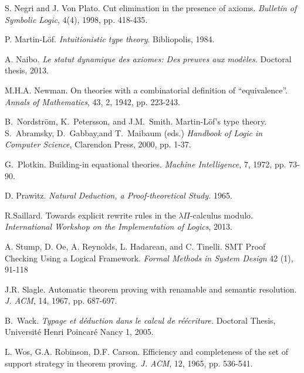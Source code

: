 \documentclass{llncs}
\begin{document}
\begin{thebibliography}{99.}
S. Negri and J. Von Plato.
Cut elimination in the presence of axioms.
{\em Bulletin of Symbolic Logic}, 4(4), 1998, pp. 418-435.

P. Martin-L\"of.
{\em Intuitionistic type theory}.
Bibliopolis, 1984.

A. Naibo.
{\em Le statut dynamique des axiomes: Des preuves aux mod\`eles.}
Doctoral thesis, 2013.

M.H.A. Newman.
On theories with a combinatorial definition of ``equivalence''. 
{\em Annals of Mathematics}, 43, 2, 1942, pp. 223-243.

 B.~Nordstr\"om, K.~Petersson, and J.M.~Smith.
Martin-L\"of's type theory. 
S.~Abramsky, D.~Gabbay,and T.~Maibaum (eds.)
{\em Handbook of Logic in Computer Science}, 
Clarendon Press, 2000, pp. 1-37.

G.~Plotkin.
Building-in equational theories.
{\em Machine Intelligence}, 7, 1972, pp. 73-90.

D. Prawitz.
{\em Natural Deduction, a Proof-theoretical Study.}
1965.

R.Saillard.
Towards explicit rewrite rules in the $\lambda \Pi$-calculus modulo.
{\em International Workshop on the Implementation of Logics}, 2013.

A. Stump, D. Oe, A. Reynolds, L. Hadarean, and C. Tinelli. 
SMT Proof Checking Using a Logical Framework. 
{\em Formal Methods in System Design} 42 (1), 91-118

J.R. Slagle.
Automatic theorem proving with renamable and semantic resolution.
{\em J. ACM}, 14, 1967, pp. 687-697.

B.~Wack.
{\em Typage et d\'eduction dans le calcul de r\'e\'ecriture.}
Doctoral Thesis, Universit\'e Henri Poincar\'e Nancy 1, 
2005.

L. Wos, G.A. Robinson, D.F. Carson.
Efficiency and completeness of the set of support strategy in theorem
proving.
{\em J. ACM}, 12, 1965, pp. 536-541.
\end{thebibliography}
\end{document}
